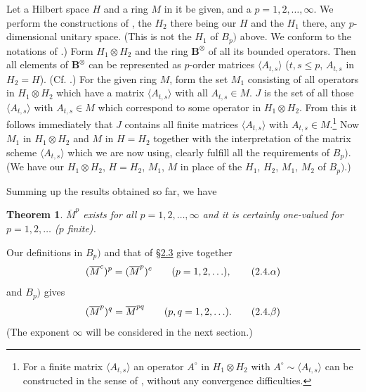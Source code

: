 \documentclass[b5paper,twoside]{article}
\newcommand{\secref}[2]{\hyperref[#1]{\mbox{\S#2}}}
\theoremstyle{mvnplain}
\newtheorem{theorem}{Theorem}
\newcommand{\M}{\mathbf M}
\newcommand{\Hilbert}{\mathfrak H}
\def\M{M}%
\def\Hilbert{H}%
\def\mathfrak#1{#1}%
\begin{document}
Let a Hilbert space $\Hilbert$ and a ring $\M$ in it be given, and a
$p=1,2,\ldots,\infty$.  We perform the constructions of \cite[loc. cit.]{ref5},
the $\Hilbert_2$ there being our $\Hilbert$ and the $\Hilbert_1$ there, any
$p$-dimensional unitary space.  (This is not the $\Hilbert_1$ of $B_p)$ above.
We conform to the notations of \cite[loc. cit.]{ref5}.)  Form
$\Hilbert_1\otimes\Hilbert_2$ and the ring $\mathbf B^{\otimes}$ of all its
bounded operators.  Then all elements of $\mathbf B^{\otimes}$ can be
represented as $p$-order matrices $\langle A_{t,s}\rangle$
($t,s\leq p$, $A_{t,s}$ in $\Hilbert_2=\Hilbert$).  (Cf.
\cite[p.~136, Definition~2.4.2 and Lemma~2.4.2]{ref5}.)  For the given ring
$\M$, form the set $\M_1$ consisting of all operators in
$\Hilbert_1\otimes\Hilbert_2$ which have a matrix $\langle A_{t,s}\rangle$
with all $A_{t,s}\in\M$.  $\mathfrak J$ is the set of all those
$\langle A_{t,s}\rangle$ with $A_{t,s}\in\M$ which correspond to some
operator in $\Hilbert_1\otimes\Hilbert_2$.  From this it follows immediately
that $\mathfrak J$ contains all finite matrices $\langle A_{t,s}\rangle$ with
$A_{t,s}\in\M$.\footnote{For a finite matrix $\langle A_{t,s}\rangle$ an
operator $A^{\circ}$ in $\Hilbert_1\otimes\Hilbert_2$ with
$A^{\circ}\sim\langle A_{t,s}\rangle$ can be constructed in the sense of
\cite[p.~136, Definition~2.4.2]{ref5}, without any convergence difficulties.}
Now $\M_1$ in $\Hilbert_1\otimes\Hilbert_2$ and $\M$ in
$\Hilbert=\Hilbert_2$ together with the interpretation of the matrix scheme
$\langle A_{t,s}\rangle$ which we are now using, clearly fulfill all the
requirements of $B_p)$.  (We have our
$\Hilbert_1\otimes\Hilbert_2$, $\Hilbert=\Hilbert_2$, $\M_1$, $\M$ in place
of the $\Hilbert_1$, $\Hilbert_2$, $\M_1$, $\M_2$ of $B_p)$.)

Summing up the results obtained so far, we have
\begin{theorem}\label{thm:IV}
$\overline{\M}^{p}$ exists for all $p=1,2,\ldots,\infty$ and it is certainly
one-valued for $p=1,2,\ldots$ ($p$ finite).
\end{theorem}
Our definitions in $B_p)$ and that of \secref{sec:2.3}{2.3} give together
\begin{equation}
  (\overline{\M}^{c})^{p}=(\overline{\M}^{p})^{c}
  \qquad(p=1,2,\ldots),
  \tag{2.4.\ensuremath{\alpha}}\label{eq:2.4.alpha}
\end{equation}
and $B_p)$ gives
\begin{equation}
  (\overline{\M}^{p})^{q}=\overline{\M}^{pq}
  \qquad(p,q=1,2,\ldots).
  \tag{2.4.\ensuremath{\beta}}\label{eq:2.4.beta}
\end{equation}
(The exponent $\infty$ will be considered in the next section.)
\end{document}
